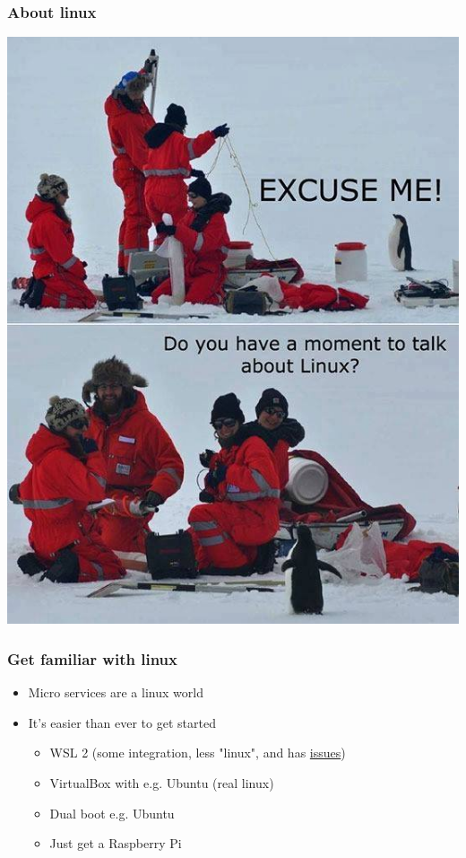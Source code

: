 \documentclass[8pt]{article}
\begin{document}
\subsubsection{About linux}
\label{sec:org9158325}
\begin{center}
\includegraphics[width=.9\linewidth]{graphics/linux.jpg}
\end{center}
\subsubsection{Get familiar with linux}
\label{sec:orgd8ba4fb}
\begin{itemize}
\item Micro services are a linux world
\item It's easier than ever to get started
\begin{itemize}
\item WSL 2 (some integration, less "linux", and has \href{https://www.polv.cc/post/2020/11/wsl-vs-virtualbox}{issues})
\item VirtualBox with e.g. Ubuntu (real linux)
\item Dual boot e.g. Ubuntu
\item Just get a Raspberry Pi
\end{itemize}
\end{itemize}
\end{document}
